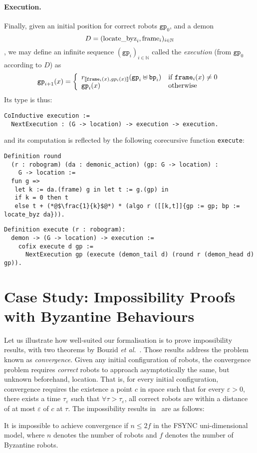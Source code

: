 \documentclass[11pt,a4]{llncs}
\newcommand{\x}{\xspace}
\newcommand{\gp}{\ensuremath{\texttt{gp}\x}}
\newcommand{\bp}{\ensuremath{\texttt{bp}\x}}
\newcommand{\sem}[1]{\ensuremath{[\![#1]\!]\x}}
\renewcommand{\epsilon}{\varepsilon}
\begin{document}
\paragraph*{Execution.}\label{sec:execution}
Finally, given an initial position for correct robots $\gp_0$, and a demon
      $$D = (\mbox{\lstinline!locate_byz!}_i, \mbox{\lstinline!frame!}_i)_{i\in \mathbb{N}}$$,
      we may define an infinite sequence $(\gp_i)_{i\in\mathbb{N}}$ called the \emph{execution} (from $\gp_0$
      according to $D$)
      as
      \[\gp_{i+1}(x)=\left\lbrace\begin{array}{ll}
       r_{\sem{\mbox{\scriptsize\texttt{frame}}_i(x),gp_i(x)}}(\gp_i \uplus
       \bp_i) & \textrm{if } \mbox{\texttt{frame}}_i(x) \neq 0 \\
       \gp_i(x) & \textrm{otherwise}\end{array}\right.\]
Its type is thus: 
\begin{lstlisting}
CoInductive execution := 
  NextExecution : (G -> location) -> execution -> execution.
\end{lstlisting}
and its computation is reflected by the following corecursive function
\lstinline!execute!:
\begin{lstlisting}
Definition round 
  (r : robogram) (da : demonic_action) (gp: G -> location) : 
    G -> location := 
  fun g =>
   let k := da.(frame) g in let t := g.(gp) in
   if k = 0 then t 
   else t + (*@$\frac{1}{k}$@*) * (algo r ([[k,t]]{gp := gp; bp := locate_byz da})).

\end{lstlisting}
\begin{lstlisting}
Definition execute (r : robogram): 
  demon -> (G -> location) -> execution :=
    cofix execute d gp :=
      NextExecution gp (execute (demon_tail d) (round r (demon_head d) gp)).
\end{lstlisting}


\section{Case Study: Impossibility Proofs with Byzantine Behaviours}
\label{sec:some-proofs}

Let us illustrate how well-suited our formalisation
is to prove impossibility results, with two theorems by Bouzid \emph{et al.}~\cite{bouzid10tcs}.
Those results address the problem known as \emph{convergence}.
Given any initial configuration of robots, the convergence problem
requires \emph{correct} robots to approach asymptotically the
same, but unknown beforehand, location.
That is, for every initial configuration,
convergence requires the existence a point $c$ in space such that for every $\epsilon > 0$, there exists a time
$\tau_\epsilon$ such that $\forall \tau > \tau_\epsilon$, all correct
robots are within a distance of at most $\epsilon$ of $c$ at $\tau$.
The impossibility results in~\cite{bouzid10tcs} are as follows:
\begin{theorem}\label{thm:demi} It is
  impossible to achieve convergence if $n \leq 2f$ in the
  FSYNC uni-dimensional model,
  where $n$ denotes the number of robots and $f$ denotes the number of
  Byzantine robots.
\end{theorem}
\end{document}
